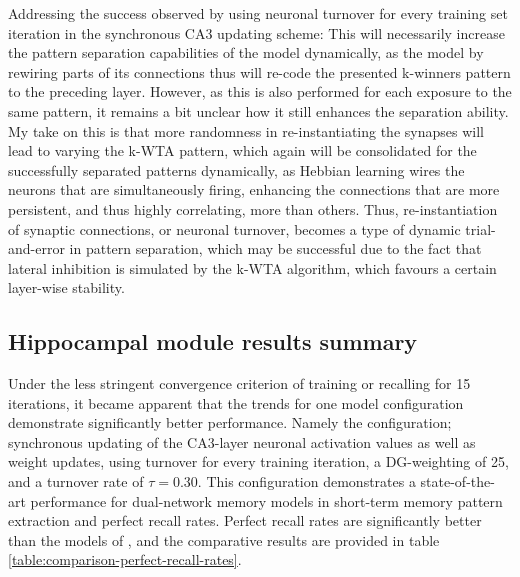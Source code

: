 Addressing the success observed by using neuronal turnover for every training set iteration in the synchronous CA3 updating scheme: 
This will necessarily increase the pattern separation capabilities of the model dynamically, as the model by rewiring parts of its connections thus will re-code the presented k-winners pattern to the preceding layer. However, as this is also performed for each exposure to the same pattern, it remains a bit unclear how it still enhances the separation ability. My take on this is that more randomness in re-instantiating the synapses will lead to varying the k-WTA pattern, which again will be consolidated for the successfully separated patterns dynamically, as Hebbian learning wires the neurons that are simultaneously firing, enhancing the connections that are more persistent, and thus highly correlating, more than others. Thus, re-instantiation of synaptic connections, or neuronal turnover, becomes a type of dynamic trial-and-error in pattern separation, which may be successful due to the fact that lateral inhibition is simulated by the k-WTA algorithm, which favours a certain layer-wise stability.

\subsection{Hippocampal module results summary}

Under the less stringent convergence criterion of training or recalling for 15 iterations, it became apparent that the trends for one model configuration demonstrate significantly better performance. Namely the configuration; synchronous updating of the CA3-layer neuronal activation values as well as weight updates, using turnover for every training iteration, a DG-weighting of 25, and a turnover rate of $\tau=0.30$.
This configuration demonstrates a state-of-the-art performance for dual-network memory models in short-term memory pattern extraction and perfect recall rates. Perfect recall rates are significantly better than the models of \citep{Hattori2014, Hattori2010}, and the comparative results are provided in table \ref{table:comparison-perfect-recall-rates}.


